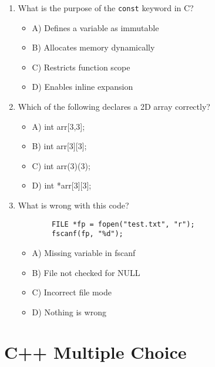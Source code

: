 \documentclass[a4paper,12pt]{article}
\begin{document}
\begin{enumerate}
    \item What is the purpose of the \verb|const| keyword in C?
    \begin{itemize}
        \item A) Defines a variable as immutable
        \item B) Allocates memory dynamically
        \item C) Restricts function scope
        \item D) Enables inline expansion
    \end{itemize}

    \item Which of the following declares a 2D array correctly?
    \begin{itemize}
        \item A) int arr[3,3];
        \item B) int arr[3][3];
        \item C) int arr(3)(3);
        \item D) int *arr[3][3];
    \end{itemize}

    \item What is wrong with this code?

    \lstset{language=C}
    \begin{lstlisting}
        FILE *fp = fopen("test.txt", "r");
        fscanf(fp, "%d");
    \end{lstlisting}
    
    \begin{itemize}
        \item A) Missing variable in fscanf
        \item B) File not checked for NULL
        \item C) Incorrect file mode
        \item D) Nothing is wrong
    \end{itemize}
\end{enumerate}

\newpage

\section{C++ Multiple Choice}
\end{document}
